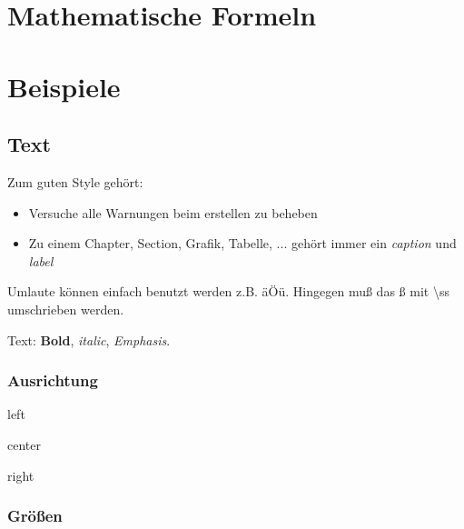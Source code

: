 
\blinddocument

\chapter{Mathematische Formeln}\label{cha:mathematischeFormeln}

\blindmathpaper

\chapter{Beispiele}\label{cha:beispiele}

\blindtext

\section{Text}\label{sec:text}

Zum guten Style gehört:
\begin{itemize}
	\item Versuche alle Warnungen beim erstellen zu beheben
	\item Zu einem Chapter, Section, Grafik, Tabelle, ... gehört immer ein \textit{caption} und \textit{label}
\end{itemize}

Umlaute können einfach benutzt werden z.B. äÖü. Hingegen mu{\ss} das {\ss} mit \textbackslash ss umschrieben werden.\par

Text: \textbf{Bold}, \textit{italic}, \emph{Emphasis}.\par

\subsection{Ausrichtung}\label{ssec:ausrichtung}

\begin{flushleft}
left
\end{flushleft}

\begin{center}
center
\end{center}

\begin{flushright}
right
\end{flushright}

\subsection{Grö{\ss}en}\label{ssec:groessen}

